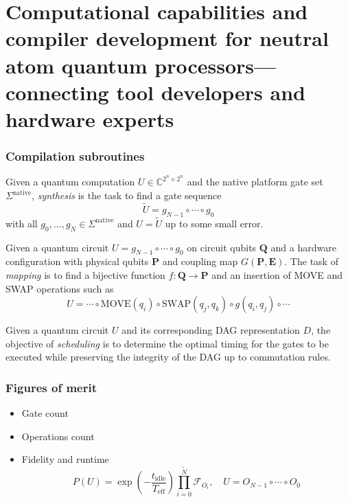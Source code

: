 \documentclass[18 pt]{beamer}
\begin{document}
\section{Computational capabilities and compiler development for neutral atom quantum processors—connecting tool developers and hardware experts}
\begin{frame}
    \frametitle{Compilation subroutines}
    \begin{definition}[Synthesis]
        \scriptsize
        Given a quantum computation \(U \in \mathbb{C}^{2^n \times 2^n}\) and the native platform gate set \(\Sigma^{\text{native}}\), \textit{synthesis} is the task to find a gate sequence
        \[
        \tilde{U} = g_{N-1} \circ \cdots \circ g_{0}
        \]
        with all \(g_0, \ldots, g_N \in \Sigma^{\text{native}}\) and \(U = \tilde{U}\) up to some small error.
    \end{definition}
    
    \begin{definition}[Mapping]
        \scriptsize
        Given a quantum circuit \(U = g_{N-1} \circ \cdots \circ g_{0}\) on circuit qubits \(\mathbf{Q}\) and a hardware configuration with physical qubits \(\mathbf{P}\) and coupling map \(G(\mathbf{P}, \mathbf{E})\). The task of \textit{mapping} is to find a bijective function \(f: \mathbf{Q} \rightarrow \mathbf{P}\) and an insertion of MOVE and SWAP operations such as
        \[
        U = \cdots \circ \text{MOVE}(q_i) \circ \text{SWAP}(q_j, q_k) \circ g(q_i, q_j) \circ \cdots
        \]
    \end{definition}
    
    \begin{definition}[Scheduling]
        \scriptsize
        Given a quantum circuit \(U\) and its corresponding DAG representation \(D\), the objective of \textit{scheduling} is to determine the optimal timing for the gates to be executed while preserving the integrity of the DAG up to commutation rules.
    \end{definition}
\end{frame}
\begin{frame}
    \frametitle{Figures of merit}
    \begin{itemize}
        \item Gate count
        \item Operations count
        \item Fidelity and runtime
        \begin{equation*}
            P(U) = \exp \left( -\frac{t_{\text{idle}}}{T_{\text{eff}}} \right) \prod_{i=0}^{\tilde{N}} \mathcal{F}_{O_i}, \quad U= O_{N-1} \circ \cdots \circ O_{0}
        \end{equation*}
    \end{itemize}
\end{frame}
\end{document}

